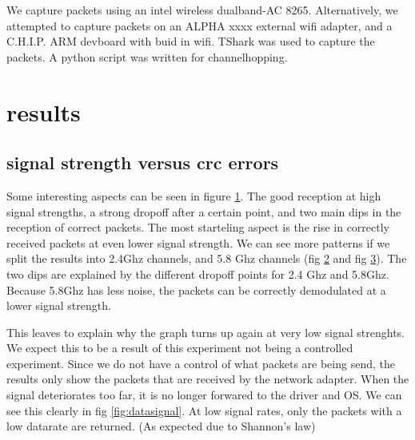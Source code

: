 \documentclass{article}
\begin{document}
We capture packets using an intel wireless dualband-AC 8265. Alternatively, we attempted to capture packets on an ALPHA xxxx external wifi adapter, and a C.H.I.P. ARM devboard with buid in wifi.
TShark was used to capture the packets. A python script was written for channelhopping.


\section{results}

\subsection{signal strength versus crc errors}

\begin{figure}
		\caption{}
		\label{fig:totalpackets}
\end{figure}

Some interesting aspects can be seen in figure \ref{fig:totalpackets}. The good reception at high signal strengths, a strong dropoff after a certain point, and two main dips in the reception of correct packets. The most starteling aspect is the rise in correctly received packets at even lower signal strength. We can see more patterns if we split the results into 2.4Ghz channels, and 5.8 Ghz channels (fig \ref{fig:24packets} and fig \ref{fig:58packets}). The two dips are explained by the different dropoff points for 2.4 Ghz and 5.8Ghz. Because 5.8Ghz has less noise, the packets can be correctly demodulated at a lower signal strength.

\begin{figure}
		\caption{}
		\label{fig:24packets}
\end{figure}

\begin{figure}
		\caption{}
		\label{fig:58packets}
\end{figure}

This leaves to explain why the graph turns up again at very low signal strenghts. We expect this to be a result of this experiment not being a controlled experiment. Since we do not have a control of what packets are being send, the results only show the packets that are received by the network adapter. When the signal deteriorates too far, it is no longer forwared to the driver and OS. We can see this clearly in fig \ref{fig:datasignal}. At low signal rates, only the packets with a low datarate are returned. (As expected due to Shannon's law)
\end{document}
